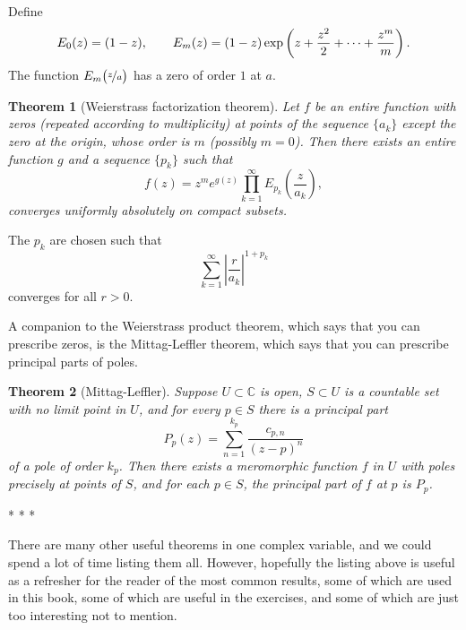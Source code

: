 \documentclass[12pt,openany]{book}
\newcommand{\avoidbreak}{\postdisplaypenalty=100}
\newcommand{\abs}[1]{\left\lvert {#1} \right\rvert}
\newcommand{\C}{{\mathbb{C}}}
\theoremstyle{plain}
\newtheorem{thm}{Theorem}[section]
\theoremstyle{remark}
\theoremstyle{definition}
\theoremstyle{exercise}
\theoremstyle{example}
\begin{document}
Define
\begin{equation*}
E_0(z) = (1-z), \qquad
E_m(z) = (1-z) \exp\left( z +\frac{z^2}{2} + \cdots + \frac{z^m}{m} \right)
.
\avoidbreak
\end{equation*}
The function $E_m\bigl(\nicefrac{z}{a}\bigr)$ has a zero of order $1$ at $a$.

\begin{thm}[Weierstrass factorization theorem]
Let $f$ be an entire function with zeros (repeated according to multiplicity) at points of
the sequence $\{ a_k \}$ except the zero at
the origin, whose order is $m$ (possibly $m=0$).  Then there exists an
entire function $g$ and a sequence $\{ p_k \}$ such that
\begin{equation*}
f(z) = z^m e^{g(z)} \prod_{k=1}^\infty E_{p_k}\left(\frac{z}{a_k}\right) ,
\end{equation*}
converges uniformly absolutely on compact subsets.
\end{thm}

The $p_k$ are chosen such that
\begin{equation*}
\sum_{k=1}^\infty {\abs{\frac{r}{a_k}}}^{1+p_k}
\end{equation*}
converges for all $r > 0$.

A companion to the Weierstrass product theorem,
which says that you can prescribe zeros,
is the Mittag-Leffler theorem, which says that you
can prescribe principal parts of poles.

\begin{thm}[Mittag-Leffler]
Suppose $U \subset \C$ is open, $S \subset U$ is a countable set with no
limit point in $U$, and for every $p \in S$ there is a principal part
\begin{equation*}
P_p(z) = \sum_{n=1}^{k_p} \frac{c_{p,n}}{{(z-p)}^n}
\end{equation*}
of a pole of order $k_p$.  Then there exists a meromorphic function $f$ in $U$
with poles precisely at points of $S$, and for each $p \in S$,
the principal part of $f$ at $p$ is $P_p$.
\end{thm}


\begin{center}
* * *
\end{center}

There are many other useful theorems in one complex variable, and we could
spend a lot of time listing them all.
However, hopefully the listing above is useful
as a refresher for the reader of the most common results, some of which are
used in this book, some of which are useful in the exercises, and some of
which are just too interesting not to mention.
\end{document}
